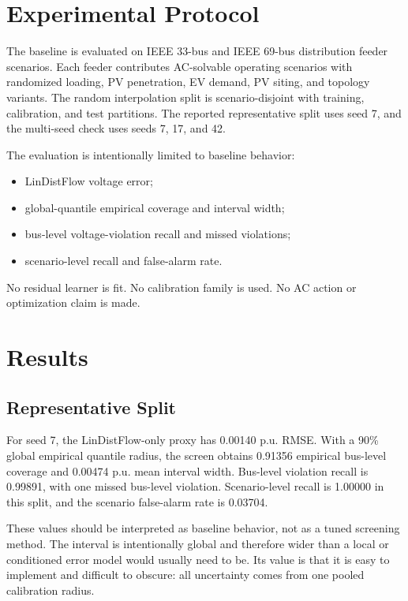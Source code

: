 \documentclass[
  journal]{IEEEtran}
\providecommand{\tightlist}{%
  \setlength{\itemsep}{0pt}\setlength{\parskip}{0pt}}
\begin{document}
\section{Experimental Protocol}\label{experimental-protocol}

The baseline is evaluated on IEEE 33-bus and IEEE 69-bus distribution
feeder scenarios. Each feeder contributes AC-solvable operating
scenarios with randomized loading, PV penetration, EV demand, PV siting,
and topology variants. The random interpolation split is
scenario-disjoint with training, calibration, and test partitions. The
reported representative split uses seed 7, and the multi-seed check uses
seeds 7, 17, and 42.

The evaluation is intentionally limited to baseline behavior:

\begin{itemize}
\tightlist
\item
  LinDistFlow voltage error;
\item
  global-quantile empirical coverage and interval width;
\item
  bus-level voltage-violation recall and missed violations;
\item
  scenario-level recall and false-alarm rate.
\end{itemize}

No residual learner is fit. No calibration family is used. No AC action
or optimization claim is made.

\section{Results}\label{results}

\subsection{Representative Split}\label{representative-split}

For seed 7, the LinDistFlow-only proxy has 0.00140 p.u. RMSE. With a
90\% global empirical quantile radius, the screen obtains 0.91356
empirical bus-level coverage and 0.00474 p.u. mean interval width.
Bus-level violation recall is 0.99891, with one missed bus-level
violation. Scenario-level recall is 1.00000 in this split, and the
scenario false-alarm rate is 0.03704.

These values should be interpreted as baseline behavior, not as a tuned
screening method. The interval is intentionally global and therefore
wider than a local or conditioned error model would usually need to be.
Its value is that it is easy to implement and difficult to obscure: all
uncertainty comes from one pooled calibration radius.
\end{document}
